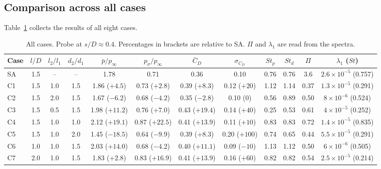 \documentclass[11pt,a4paper]{article}
\newcommand{\pbar}{\bar{p}/p_\infty}
\newcommand{\psd}{p_\sigma/p_\infty}
\newcommand{\Cdm}{\bar{C}_D}
\newcommand{\sCd}{\sigma_{C_D}}
\newcommand{\ltl}{l_2/l_1}
\newcommand{\dtd}{d_2/d_1}
\begin{document}
\subsection{Comparison across all cases}\label{sec:synthesis}

Table~\ref{tab:master} collects the results of all eight cases.

\begin{table}[htbp]
  \centering
  \caption{All cases. Probe at $s/D \approx 0.4$. Percentages in brackets are relative to SA. $\Pi$ and $\lambda_1$ are read from the spectra.}
  \label{tab:master}
  \footnotesize
  \setlength{\tabcolsep}{2.5pt}
  \begin{tabular}{lccccccccccc}
    \toprule
    Case & $l/D$ & $\ltl$ & $\dtd$ & $\pbar$ & $\psd$ & $\Cdm$ & $\sCd$ & $St_p$ & $St_d$ & $\Pi$ & $\lambda_1$ ($St$) \\
    \midrule
    SA & 1.5 & -- & -- & 1.78 & 0.71 & 0.36 & 0.10 & 0.76 & 0.76 & 3.6 & $2.6\times10^{-5}$ (0.757) \\
    C1 & 1.5 & 1.0 & 1.5 & 1.86 ($+4.5$) & 0.73 ($+2.8$) & 0.39 ($+8.3$) & 0.12 ($+20$) & 1.12 & 1.14 & 0.37 & $1.3\times10^{-5}$ (0.291) \\
    C2 & 1.5 & 2.0 & 1.5 & 1.67 ($-6.2$) & 0.68 ($-4.2$) & 0.35 ($-2.8$) & 0.10 (0) & 0.56 & 0.89 & 0.50 & $8\times10^{-6}$ (0.524) \\
    C3 & 1.5 & 0.5 & 1.5 & 1.98 ($+11.2$) & 0.76 ($+7.0$) & 0.43 ($+19.4$) & 0.14 ($+40$) & 0.25 & 0.53 & 0.61 & $4\times10^{-5}$ (0.252) \\
    C4 & 1.5 & 1.0 & 1.0 & 2.12 ($+19.1$) & 0.87 ($+22.5$) & 0.41 ($+13.9$) & 0.11 ($+10$) & 0.83 & 0.83 & 0.72 & $1.4\times10^{-5}$ (0.835) \\
    C5 & 1.5 & 1.0 & 2.0 & 1.45 ($-18.5$) & 0.64 ($-9.9$) & 0.39 ($+8.3$) & 0.20 ($+100$) & 0.74 & 0.65 & 0.44 & $5.5\times10^{-5}$ (0.291) \\
    C6 & 1.0 & 1.0 & 1.5 & 2.03 ($+14.0$) & 0.68 ($-4.2$) & 0.40 ($+11.1$) & 0.09 ($-10$) & 1.13 & 1.12 & 0.50 & $6\times10^{-6}$ (0.505) \\
    C7 & 2.0 & 1.0 & 1.5 & 1.83 ($+2.8$) & 0.83 ($+16.9$) & 0.41 ($+13.9$) & 0.16 ($+60$) & 0.82 & 0.82 & 0.54 & $2.5\times10^{-5}$ (0.214) \\
    \bottomrule
  \end{tabular}
\end{table}
\end{document}
